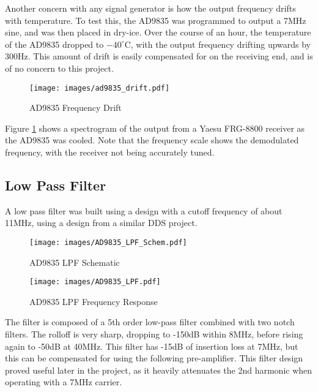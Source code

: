 \documentclass[a4paper,12pt]{article}
\begin{document}
Another concern with any signal generator is how the output frequency drifts with temperature. To test this, the AD9835 was programmed to output a 7MHz sine, and was then placed in dry-ice. Over the course of an hour, the temperature of the AD9835 dropped to $-40^\circ$C, with the output frequency drifting upwards by 300Hz. This amount of drift is easily compensated for on the receiving end, and is of no concern to this project.

\begin{figure}[h]
  \begin{center}
    \texttt{[image: images/ad9835\_drift.pdf]}
  \end{center}
  \caption{AD9835 Frequency Drift}
  \label{fig:ad9835_drift}
\end{figure}

Figure \ref{fig:ad9835_drift} shows a spectrogram of the output from a Yaesu FRG-8800 receiver as the AD9835 was cooled. Note that the frequency scale shows the demodulated frequency, with the receiver not being accurately tuned. 

\subsection{Low Pass Filter}
A low pass filter was built using a design with a cutoff frequency of about 11MHz, using a design from a similar DDS project\citep{ref:lpf}.  

\begin{figure}[h]
  \begin{center}
    \texttt{[image: images/AD9835\_LPF\_Schem.pdf]}
  \end{center}
  \caption{AD9835 LPF Schematic}
  \label{fig:ad9835_lpf_schem}
\end{figure}

\begin{figure}[h]
  \begin{center}
    \texttt{[image: images/AD9835\_LPF.pdf]}
  \end{center}
  \caption{AD9835 LPF Frequency Response}
  \label{fig:ad9835_lpf}
\end{figure}

The filter is composed of a 5th order low-pass filter combined with two notch filters. The rolloff is very sharp, dropping to -150dB within 8MHz, before rising again to -50dB at 40MHz. This filter has -15dB of insertion loss at 7MHz, but this can be compensated for using the following pre-amplifier. This filter design proved useful later in the project, as it heavily attenuates the 2nd harmonic when operating with a 7MHz carrier.
\end{document}

